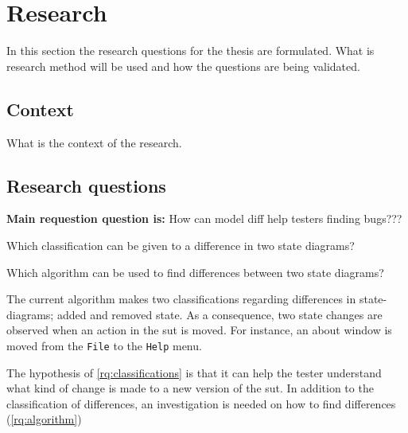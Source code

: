 \section{Research} \label{questions}
In this section the research questions for the thesis are formulated. What is research method will be used and how the questions are being validated.

\subsection{Context}
What is the context of the research. 

\subsection{Research questions}

\textbf{Main requestion question is:} How can model diff help testers finding bugs???


\begin{questions}
    \item Which classification can be given to a difference in two state diagrams? \label{rq:classifications} 
    \begin{questions}
        \item Which algorithm can be used to find differences between two state diagrams? \label{rq:algorithm}    
    \end{questions}
\end{questions}
The current algorithm \cite{stateDiff} makes two classifications regarding differences in state-diagrams; added and removed state. As a consequence, two state changes are observed when an action in the \acrshort{sut} is moved. For instance, an about window is moved from the \verb|File| to the \verb|Help| menu. 

The hypothesis of \ref{rq:classifications} is that it can help the tester understand what kind of change is made to a new version of the \acrshort{sut}. In addition to the classification of differences, an investigation is needed on how to find differences (\ref{rq:algorithm})


